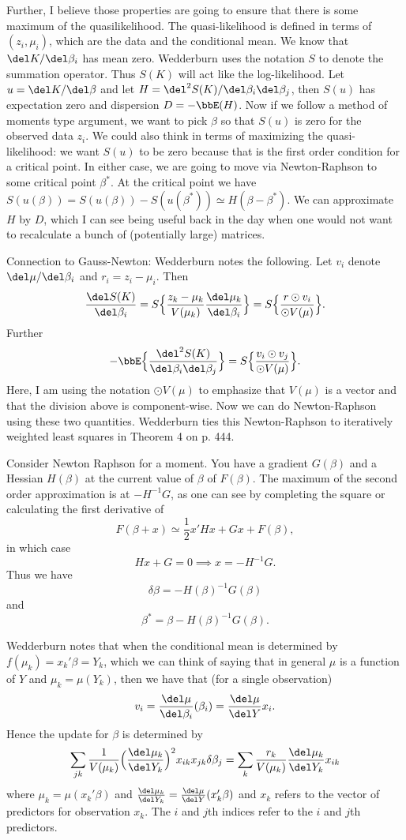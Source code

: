 \documentclass{article}
\newcommand{\graddel}[2]{\frac{\del #1}{\del #2}}
\newcommand{\hessdel}[3]{\frac{\del^2 #1}{\del #2 \del #3}}
\begin{document}
Further, I believe those properties are going to ensure that there is some
maximum of the quasilikelihood.  The quasi-likelihood is defined in terms of
$(z_i, \mu_i)$, which are the data and the conditional mean.  We know that $\del
K / \del \beta_i$ has mean zero.  Wedderburn uses the notation $S$ to denote the
summation operator.  Thus $S(K)$ will act like the log-likelihood.  Let $u =
\del K / \del \beta$ and let $H = \del^2 S(K) / \del \beta_i \del \beta_j$, then
$S(u)$ has expectation zero and dispersion $D = - \bbE(H)$.  Now if we follow a
method of moments type argument, we want to pick $\beta$ so that $S(u)$ is zero
for the observed data $z_i$.  We could also think in terms of maximizing the
quasi-likelihood: we want $S(u)$ to be zero because that is the first order
condition for a critical point.  In either case, we are going to move via
Newton-Raphson to some critical point $\beta^*$.  At the critical point we have
$S(u(\beta)) = S(u(\beta)) - S(u(\beta^*)) \simeq H(\beta - \beta^*)$.  We can
approximate $H$ by $D$, which I can see being useful back in the day when one
would not want to recalculate a bunch of (potentially large) matrices.

Connection to Gauss-Newton: Wedderburn notes the following.  Let $v_i$ denote
$\del \mu / \del \beta_i$ and $r_i = z_i - \mu_i$.  Then
\[
\graddel{S(K)}{\beta_i} = S \Big\{ \frac{z_k - \mu_k}{V(\mu_k)} \frac{\del
  \mu_k}{ \del \beta_i} \Big\} = S \Big\{ \frac{r \odot v_i}{\odot V(\mu)} \Big\}.
\]
Further
\[
- \bbE \Big\{ \hessdel{S(K)}{\beta_i}{\beta_j} \Big\} = S \Big\{ \frac{v_i
  \odot v_j}{\odot V(\mu)} \Big\}.
\]
Here, I am using the notation $\odot V(\mu)$ to emphasize that $V(\mu)$ is a
vector and that the division above is component-wise.  Now we can do
Newton-Raphson using these two quantities.  Wedderburn ties this Newton-Raphson
to iteratively weighted least squares in Theorem 4 on p. 444.

Consider Newton Raphson for a moment.  You have a gradient $G(\beta)$ and a
Hessian $H(\beta)$ at the current value of $\beta$ of $F(\beta)$.  The maximum
of the second order approximation is at $-H^{-1} G$, as one can see by
completing the square or calculating the first derivative of
\[
F(\beta + x) \simeq \frac{1}{2} x' H x + G x + F(\beta),
\]
in which case
\[
Hx + G = 0 \implies x = - H^{-1} G.
\]
Thus we have
\[
\delta \beta = - H(\beta)^{-1} G(\beta)
\]
and
\[
\beta^* = \beta - H(\beta)^{-1} G(\beta).
\]

Wedderburn notes that when the conditional mean is determined by $f(\mu_k) =
x_k' \beta = Y_k$, which we can think of saying that in general $\mu$ is a
function of $Y$ and $\mu_k = \mu(Y_k)$, then we have that (for a single
observation)
\[
v_i = \graddel{\mu}{\beta_i}(\beta_i) = \graddel{\mu}{Y} x_i .
\]
Hence the update for $\beta$ is determined by
\[
\sum_{jk} \frac{1}{V(\mu_k)} \Big(\graddel{\mu_k}{Y_k}\Big)^2 x_{ik} x_{jk} \delta
\beta_j
= \sum_{k} \frac{r_k}{V(\mu_k)}\graddel{\mu_k}{Y_k} x_{ik}
\]
where $\mu_k = \mu(x_k' \beta)$ and $\graddel{\mu_k}{Y_k} =
\graddel{\mu}{Y}(x_k' \beta)$ and $x_k$ refers to the vector of predictors for
observation $x_k$.  The $i$ and $j$th indices refer to the $i$ and $j$th
predictors.
\end{document}
